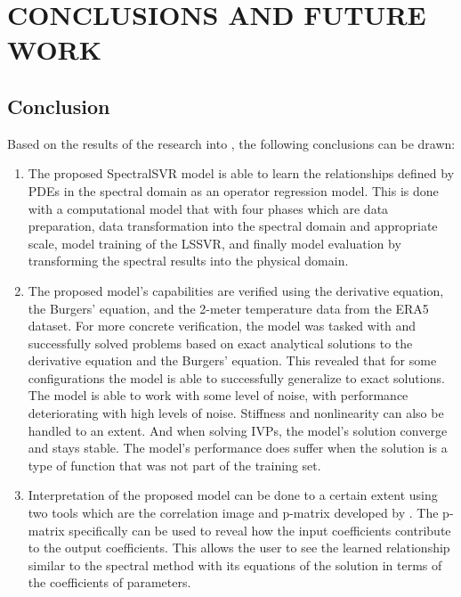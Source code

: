 \chapter{CONCLUSIONS AND FUTURE WORK}\label{ch:conclusions_and_future_work}

\section{Conclusion}
\noindent Based on the results of the research into \MakeLowercase{\judul}, the following conclusions can be drawn:
\begin{enumerate}
    \item The proposed SpectralSVR model is able to learn the relationships defined by PDEs in the spectral domain as an operator regression model. This is done with a computational model that with four phases which are data preparation, data transformation into the spectral domain and appropriate scale, model training of the LSSVR, and finally model evaluation by transforming the spectral results into the physical domain.
    \item The proposed model's capabilities are verified using the derivative equation, the Burgers' equation, and the 2-meter temperature data from the ERA5 dataset. For more concrete verification, the model was tasked with and successfully solved problems based on exact analytical solutions to the derivative equation and the Burgers' equation. This revealed that for some configurations the model is able to successfully generalize to exact solutions. The model is able to work with some level of noise, with performance deteriorating with high levels of noise. Stiffness and nonlinearity can also be handled to an extent. And when solving IVPs, the model's solution converge and stays stable. The model's performance does suffer when the solution is a type of function that was not part of the training set.
    \item Interpretation of the proposed model can be done to a certain extent using two tools which are the correlation image and p-matrix developed by \textcite{ustunVisualisationInterpretationSupport2007}. The p-matrix specifically can be used to reveal how the input coefficients contribute to the output coefficients. This allows the user to see the learned relationship similar to the spectral method with its equations of the solution in terms of the coefficients of parameters.
\end{enumerate}


